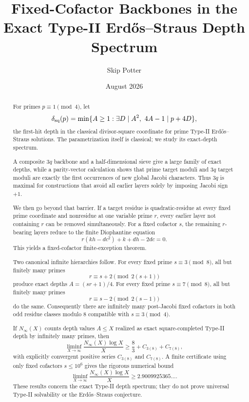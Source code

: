 \documentclass[11pt]{article}
\title{Fixed-Cofactor Backbones in the Exact Type-II Erd\H{o}s--Straus Depth Spectrum}
\author{Skip Potter}
\date{August 2026}
\theoremstyle{definition}
\newcommand{\sqdepth}{\delta_{\rm sq}}
\begin{document}
\maketitle

\begin{abstract}
For primes $p\equiv1\pmod4$, let
\[
\sqdepth(p)=\min\{A\ge1:\exists D\mid A^2,\ 4A-1\mid p+4D\},
\]
the first-hit depth in the classical divisor-square coordinate for prime Type-II Erd\H{o}s--Straus solutions. The parametrization itself is classical; we study its exact-depth spectrum.

A composite $3q$ backbone and a half-dimensional sieve give a large family of exact depths, while a parity-vector calculation shows that prime target moduli and $3q$ target moduli are exactly the first occurrences of new global Jacobi characters. Thus $3q$ is maximal for constructions that avoid all earlier layers solely by imposing Jacobi sign $+1$.

We then go beyond that barrier. If a target residue is quadratic-residue at every fixed prime coordinate and nonresidue at one variable prime $r$, every earlier layer not containing $r$ can be removed simultaneously. For a fixed cofactor $s$, the remaining $r$-bearing layers reduce to the finite Diophantine equation
\[
r(kh-dc^2)+k+dh-2dc=0.
\]
This yields a fixed-cofactor finite-exception theorem.

Two canonical infinite hierarchies follow. For every fixed prime $s\equiv3\pmod8$, all but finitely many primes
\[
r\equiv s+2\pmod{2(s+1)}
\]
produce exact depths $A=(sr+1)/4$. For every fixed prime $s\equiv7\pmod8$, all but finitely many primes
\[
r\equiv s-2\pmod{2(s-1)}
\]
do the same. Consequently there are infinitely many post-Jacobi fixed cofactors in both odd residue classes modulo $8$ compatible with $s\equiv3\pmod4$.

If $N_\infty(X)$ counts depth values $A\le X$ realized as exact square-completed Type-II depth by infinitely many primes, then
\[
\liminf_{X\to\infty}\frac{N_\infty(X)\log X}{X}
\ge \frac83+C_{3(8)}+C_{7(8)},
\]
with explicitly convergent positive series $C_{3(8)}$ and $C_{7(8)}$. A finite certificate using only fixed cofactors $s\le10^6$ gives the rigorous numerical bound
\[
\boxed{
\liminf_{X\to\infty}\frac{N_\infty(X)\log X}{X}
\ge2.9009925365\ldots .
}
\]
These results concern the exact Type-II depth spectrum; they do not prove universal Type-II solvability or the Erd\H{o}s--Straus conjecture.
\end{abstract}
\end{document}
